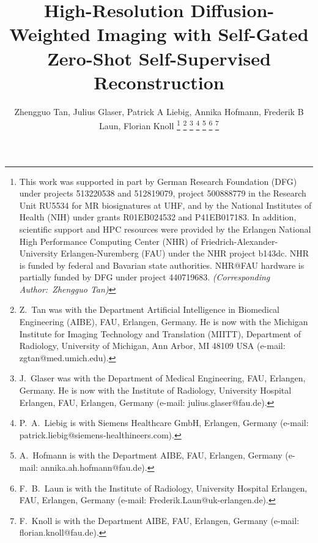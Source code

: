 \documentclass[journal,twoside,web]{ieeecolor}
\begin{document}
	\title{High-Resolution Diffusion-Weighted Imaging with Self-Gated Zero-Shot Self-Supervised Reconstruction}

	\author{Zhengguo Tan, Julius Glaser, Patrick A Liebig, Annika Hofmann, Frederik B Laun, Florian Knoll
		\thanks{This work was supported in part by
			German Research Foundation (DFG)
			under projects 513220538 and 512819079,
			project 500888779 in the Research Unit RU5534
			for MR biosignatures at UHF,
			and by the National Institutes of Health (NIH)
			under grants R01EB024532 and P41EB017183.
			In addition, scientific support and HPC resources
			were provided by
			the Erlangen National High Performance Computing Center (NHR)
			of Friedrich-Alexander-University Erlangen-Nuremberg (FAU)
			under the NHR project b143dc.
			NHR is funded by federal and Bavarian state authorities.
			NHR@FAU hardware is partially funded by
			DFG under project 440719683. \textit{(Corresponding Author:~Zhengguo Tan)}}
		\thanks{Z.~Tan was with the Department
			Artificial Intelligence in Biomedical Engineering (AIBE),
			FAU, Erlangen, Germany.
			He is now with
			the Michigan Institute for Imaging Technology and Translation
			(MIITT),
			Department of Radiology,
			University of Michigan, Ann Arbor, MI 48109 USA
			(e-mail: zgtan@med.umich.edu).}
		\thanks{J.~Glaser was with the Department of Medical Engineering,
			FAU, Erlangen, Germany.
			He is now with the Institute of Radiology,
			University Hospital Erlangen,
			FAU, Erlangen, Germany
			(e-mail: julius.glaser@fau.de).}
		\thanks{P.~A.~Liebig is with Siemens Healthcare GmbH, Erlangen, Germany
			(e-mail: patrick.liebig@siemens-healthineers.com).}
		\thanks{A.~Hofmann is with the Department AIBE,
			FAU, Erlangen, Germany
			(e-mail: annika.ah.hofmann@fau.de).}
		\thanks{F.~B.~Laun is with the Institute of Radiology,
			University Hospital Erlangen,
			FAU, Erlangen, Germany
			(e-mail: Frederik.Laun@uk-erlangen.de).}
		\thanks{F.~Knoll is with the Department AIBE,
			FAU, Erlangen, Germany
			(e-mail: florian.knoll@fau.de).}
	}

	\maketitle
\end{document}
